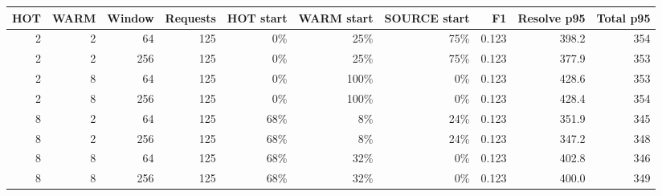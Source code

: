 \begin{tabular}{rrrrrrrrrr}
\toprule
HOT & WARM & Window & Requests & HOT start & WARM start & SOURCE start & F1 & Resolve p95 & Total p95 \\
\midrule
2 & 2 & 64 & 125 & 0\% & 25\% & 75\% & 0.123 & 398.2 & 354 \\
2 & 2 & 256 & 125 & 0\% & 25\% & 75\% & 0.123 & 377.9 & 353 \\
2 & 8 & 64 & 125 & 0\% & 100\% & 0\% & 0.123 & 428.6 & 353 \\
2 & 8 & 256 & 125 & 0\% & 100\% & 0\% & 0.123 & 428.4 & 354 \\
8 & 2 & 64 & 125 & 68\% & 8\% & 24\% & 0.123 & 351.9 & 345 \\
8 & 2 & 256 & 125 & 68\% & 8\% & 24\% & 0.123 & 347.2 & 348 \\
8 & 8 & 64 & 125 & 68\% & 32\% & 0\% & 0.123 & 402.8 & 346 \\
8 & 8 & 256 & 125 & 68\% & 32\% & 0\% & 0.123 & 400.0 & 349 \\
\bottomrule
\end{tabular}
